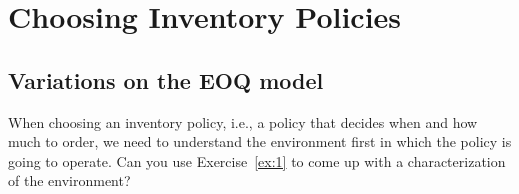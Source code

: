 
\section{Choosing Inventory Policies}

\subsection{Variations on the EOQ model}
\label{sec:variations-eoq-model}

\begin{exercise}
  When choosing an inventory policy, i.e., a policy that decides when
  and how much to order, we need to understand the environment first
  in which the policy is going to operate. Can you use
  Exercise~\ref{ex:1} to come up with a characterization of the environment? 
  \begin{comment}
    A simple starting point is provided by this table.
    \begin{table}[h]
      \centering
    \begin{tabular}{l|l|l|l}
      Environment && &  \\ \hline
Demand & variability &deterministic/constant & Stochastic \\ 
& substitution effects & yes & no \\
\hline Supply & Lead time & $L=0$& $L>0$ \\ 
& perishable items & yes & no\\
& Joint ordering & yes & no\\
& Order size constraints &yes & no \\
\hline Cost structure &Ordering cost & $A=0$ & $A>0$ \\ 
& holding cost & $h=0$ &$h>0$ \\
& fixed backlog cost & $\pi=0$ &$\pi>0$\\
&variable backlog cost & $b=0$ &$b>0$\\
&lost sales cost &$k=0$ & $k>0$ \\
&quantity discounts &yes & no \\
\hline KPIs &fill rate $S$ & yes & no\\ 
& cycle service level &yes& no\\
    \end{tabular}
    \caption{(Incomplete) characterization of the environment of inventory policies}
      \label{tab:environment}
    \end{table}
  \end{comment}
\end{exercise}

